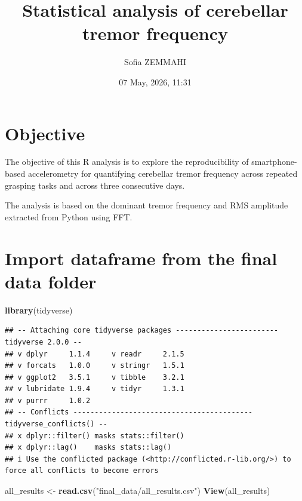 \documentclass[
]{article}
\title{Statistical analysis of cerebellar tremor frequency}
\author{Sofia ZEMMAHI}
\date{07 May, 2026, 11:31}
\newenvironment{Shaded}{\begin{snugshade}}{\end{snugshade}}
\newcommand{\FunctionTok}[1]{\textcolor[rgb]{0.13,0.29,0.53}{\textbf{#1}}}
\newcommand{\NormalTok}[1]{#1}
\newcommand{\OtherTok}[1]{\textcolor[rgb]{0.56,0.35,0.01}{#1}}
\newcommand{\StringTok}[1]{\textcolor[rgb]{0.31,0.60,0.02}{#1}}
\begin{document}
\maketitle

{
\setcounter{tocdepth}{2}
\tableofcontents
}
\hypertarget{objective}{%
\section{Objective}\label{objective}}

The objective of this R analysis is to explore the reproducibility of
smartphone-based accelerometry for quantifying cerebellar tremor
frequency across repeated grasping tasks and across three consecutive
days.

The analysis is based on the dominant tremor frequency and RMS amplitude
extracted from Python using FFT.

\hypertarget{import-dataframe-from-the-final-data-folder}{%
\section{Import dataframe from the final data
folder}\label{import-dataframe-from-the-final-data-folder}}

\begin{Shaded}
\begin{Highlighting}[]
\FunctionTok{library}\NormalTok{(tidyverse)}
\end{Highlighting}
\end{Shaded}

\begin{verbatim}
## -- Attaching core tidyverse packages ------------------------ tidyverse 2.0.0 --
## v dplyr     1.1.4     v readr     2.1.5
## v forcats   1.0.0     v stringr   1.5.1
## v ggplot2   3.5.1     v tibble    3.2.1
## v lubridate 1.9.4     v tidyr     1.3.1
## v purrr     1.0.2     
## -- Conflicts ------------------------------------------ tidyverse_conflicts() --
## x dplyr::filter() masks stats::filter()
## x dplyr::lag()    masks stats::lag()
## i Use the conflicted package (<http://conflicted.r-lib.org/>) to force all conflicts to become errors
\end{verbatim}

\begin{Shaded}
\begin{Highlighting}[]
\NormalTok{all\_results }\OtherTok{\textless{}{-}} \FunctionTok{read.csv}\NormalTok{(}\StringTok{"final\_data/all\_results.csv"}\NormalTok{)}
\FunctionTok{View}\NormalTok{(all\_results)}
\end{Highlighting}
\end{Shaded}
\end{document}
